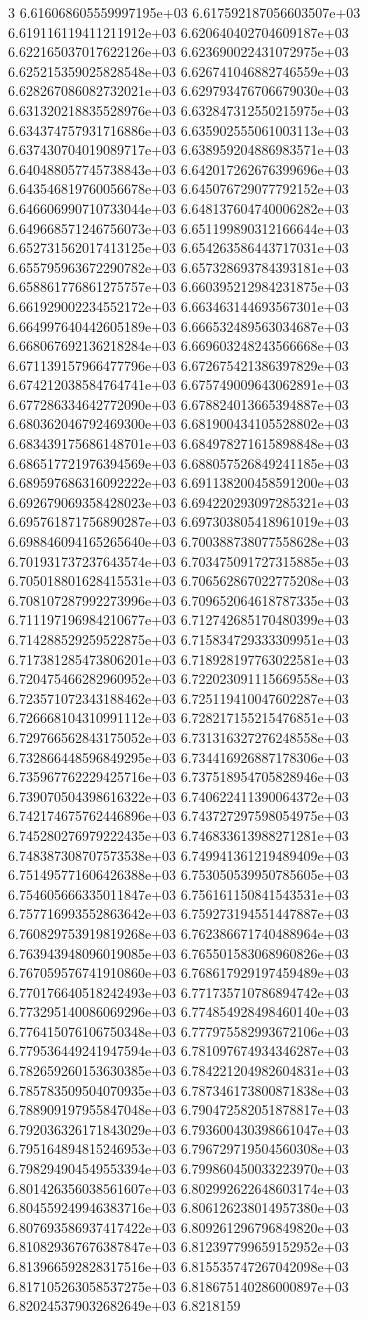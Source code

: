 3	6.616068605559997195e+03	6.617592187056603507e+03	6.619116119411211912e+03	6.620640402704609187e+03	6.622165037017622126e+03	6.623690022431072975e+03	6.625215359025828548e+03	6.626741046882746559e+03	6.628267086082732021e+03	6.629793476706679030e+03	6.631320218835528976e+03	6.632847312550215975e+03	6.634374757931716886e+03	6.635902555061003113e+03	6.637430704019089717e+03	6.638959204886983571e+03	6.640488057745738843e+03	6.642017262676399696e+03	6.643546819760056678e+03	6.645076729077792152e+03	6.646606990710733044e+03	6.648137604740006282e+03	6.649668571246756073e+03	6.651199890312166644e+03	6.652731562017413125e+03	6.654263586443717031e+03	6.655795963672290782e+03	6.657328693784393181e+03	6.658861776861275757e+03	6.660395212984231875e+03	6.661929002234552172e+03	6.663463144693567301e+03	6.664997640442605189e+03	6.666532489563034687e+03	6.668067692136218284e+03	6.669603248243566668e+03	6.671139157966477796e+03	6.672675421386397829e+03	6.674212038584764741e+03	6.675749009643062891e+03	6.677286334642772090e+03	6.678824013665394887e+03	6.680362046792469300e+03	6.681900434105528802e+03	6.683439175686148701e+03	6.684978271615898848e+03	6.686517721976394569e+03	6.688057526849241185e+03	6.689597686316092222e+03	6.691138200458591200e+03	6.692679069358428023e+03	6.694220293097285321e+03	6.695761871756890287e+03	6.697303805418961019e+03	6.698846094165265640e+03	6.700388738077558628e+03	6.701931737237643574e+03	6.703475091727315885e+03	6.705018801628415531e+03	6.706562867022775208e+03	6.708107287992273996e+03	6.709652064618787335e+03	6.711197196984210677e+03	6.712742685170480399e+03	6.714288529259522875e+03	6.715834729333309951e+03	6.717381285473806201e+03	6.718928197763022581e+03	6.720475466282960952e+03	6.722023091115669558e+03	6.723571072343188462e+03	6.725119410047602287e+03	6.726668104310991112e+03	6.728217155215476851e+03	6.729766562843175052e+03	6.731316327276248558e+03	6.732866448596849295e+03	6.734416926887178306e+03	6.735967762229425716e+03	6.737518954705828946e+03	6.739070504398616322e+03	6.740622411390064372e+03	6.742174675762446896e+03	6.743727297598054975e+03	6.745280276979222435e+03	6.746833613988271281e+03	6.748387308707573538e+03	6.749941361219489409e+03	6.751495771606426388e+03	6.753050539950785605e+03	6.754605666335011847e+03	6.756161150841543531e+03	6.757716993552863642e+03	6.759273194551447887e+03	6.760829753919819268e+03	6.762386671740488964e+03	6.763943948096019085e+03	6.765501583068960826e+03	6.767059576741910860e+03	6.768617929197459489e+03	6.770176640518242493e+03	6.771735710786894742e+03	6.773295140086069296e+03	6.774854928498460140e+03	6.776415076106750348e+03	6.777975582993672106e+03	6.779536449241947594e+03	6.781097674934346287e+03	6.782659260153630385e+03	6.784221204982604831e+03	6.785783509504070935e+03	6.787346173800871838e+03	6.788909197955847048e+03	6.790472582051878817e+03	6.792036326171843029e+03	6.793600430398661047e+03	6.795164894815246953e+03	6.796729719504560308e+03	6.798294904549553394e+03	6.799860450033223970e+03	6.801426356038561607e+03	6.802992622648603174e+03	6.804559249946383716e+03	6.806126238014957380e+03	6.807693586937417422e+03	6.809261296796849820e+03	6.810829367676387847e+03	6.812397799659152952e+03	6.813966592828317516e+03	6.815535747267042098e+03	6.817105263058537275e+03	6.818675140286000897e+03	6.820245379032682649e+03	6.8218159